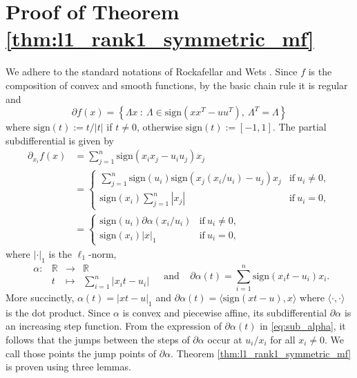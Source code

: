 \documentclass[12pt]{article}
\theoremstyle{definition}
\theoremstyle{plain}
\begin{document}
\section{Proof of Theorem \ref{thm:l1_rank1_symmetric_mf}}

We adhere to the standard notations of Rockafellar and Wets \cite[Chapter 10]{rockafellar2009variational}. Since $f$ is the composition of convex and smooth functions, by the basic chain rule \cite[Theorem 10.6]{rockafellar2009variational} it is regular and
\begin{equation}
\label{eq:subdif}
\partial f(x) = \left\{ \Lambda x ~:~ \Lambda \in \mathrm{sign}(xx^T-uu^T),~ \Lambda^T = \Lambda \right\} 
\end{equation}
where $\mathrm{sign}(t) := t/|t|$ if $t\neq 0$, otherwise $\mathrm{sign}(t) := \left[-1,1\right]$. The partial subdifferential \cite[Corollary 10.11]{rockafellar2009variational} is given by
\begin{subequations}
        \begin{align}
            \partial_{x_i} f(x) & = \sum_{j=1}^n \mathrm{sign}(x_ix_j-u_iu_j)x_j \\
        & = \left\{
    \begin{array}{cc}
     \sum\limits_{j=1}^n \mathrm{sign}(u_i) \mathrm{sign}(x_j(x_i/u_i)-u_j)x_j  & \text{if}~ u_i\neq 0, \\[1mm]
        \mathrm{sign}(x_i) \sum\limits_{j=1}^n |x_j|  & \text{if}~ u_i = 0, 
    \end{array} \right. \\
        & = \left\{
    \begin{array}{cc}
        \mathrm{sign}(u_i) \partial \alpha (x_i/u_i)  & \text{if}~ u_i\neq 0, \\[1mm]
        \mathrm{sign}(x_i) |x|_1  & \text{if}~ u_i = 0, 
    \end{array} \right. \label{eq:partial_sub}
        \end{align}
\end{subequations}
where $|\cdot|_1$ is the $\ell_1$-norm,
\begin{equation}
\label{eq:sub_alpha}
\begin{array}{rccc}
     \alpha : & \mathbb{R} & \longrightarrow & \mathbb{R}  \\
         & t & \longmapsto & \sum\limits_{i=1}^n |x_i t-u_i|
\end{array} ~~~~~ \text{and} ~~~~~ \partial \alpha(t) = \sum_{i=1}^n  \mathrm{sign}(x_it-u_i)x_i.
\end{equation}         
More succinctly, $\alpha(t) = |xt-u|_1$ and $\partial \alpha(t) = \langle \mathrm{sign}(xt-u),x\rangle$ where $\langle \cdot,\cdot\rangle$ is the dot product. Since $\alpha$ is convex and piecewise affine, its subdifferential $\partial \alpha$ is an increasing step function. From the expression of $\partial \alpha(t)$ in \eqref{eq:sub_alpha}, it follows that the jumps between the steps of $\partial \alpha$ occur at $u_i/x_i$ for all $x_i\neq 0$. We call those points the jump points of $\partial \alpha$. Theorem \ref{thm:l1_rank1_symmetric_mf} is proven using three lemmas.
\end{document}
